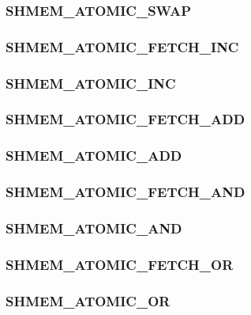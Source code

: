 \documentclass[10pt]{book}
\begin{document}
\subsubsection{\textbf{SHMEM\_ATOMIC\_SWAP}}
\label{subsec:shmem_atomic_swap}


\subsubsection{\textbf{SHMEM\_ATOMIC\_FETCH\_INC}}
\label{subsec:shmem_atomic_fetch_inc}


\subsubsection{\textbf{SHMEM\_ATOMIC\_INC}}
\label{subsec:shmem_atomic_inc}


\subsubsection{\textbf{SHMEM\_ATOMIC\_FETCH\_ADD}}
\label{subsec:shmem_atomic_fetch_add}


\subsubsection{\textbf{SHMEM\_ATOMIC\_ADD}}
\label{subsec:shmem_atomic_add}


\subsubsection{\textbf{SHMEM\_ATOMIC\_FETCH\_AND}}
\label{subsec:shmem_atomic_fetch_and}


\subsubsection{\textbf{SHMEM\_ATOMIC\_AND}}
\label{subsec:shmem_atomic_and}


\subsubsection{\textbf{SHMEM\_ATOMIC\_FETCH\_OR}}
\label{subsec:shmem_atomic_fetch_or}


\subsubsection{\textbf{SHMEM\_ATOMIC\_OR}}
\label{subsec:shmem_atomic_or}

\end{document}
